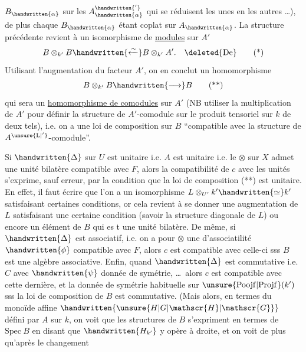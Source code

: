 $B_{\handwritten{\alpha}}$ sur les $A_{\handwritten{\alpha}}^{\handwritten{'}}$ qui se réduisent les unes en les autres \ldots),  de plus chaque $B_{\handwritten{\alpha}}$ étant coplat sur $A_{\handwritten{\alpha}}$. La structure précédente revient à un isomorphisme de \uline{modules} sur  $A'$
\[
B\otimes_{k'}B\handwritten{\xleftarrow{\sim}}B\otimes_{k'}A'.\quad\deleted{\text{De}}
\tag*{(*)}
\]
Utilisant l'augmentation du facteur $A'$, on en conclut un homomorphisme
\[
B\otimes_{k'}B\handwritten{\longrightarrow}B
\tag*{(**)}
\]
qui sera un \uline{homomorphisme de comodules} sur $A'$ (NB utiliser la multiplication de $A'$ pour définir la structure de $A'$-comodule sur le produit tensoriel sur $k$ de deux tels), i.e. on a une loi de composition sur $B$ ``compatible avec la structure de $A^{\unsure{\mathrm{L}|'}}$-comodule''.

Si $\handwritten{\Delta}$ sur $U$ est unitaire i.e. $A$ est unitaire i.e. le $\otimes$ sur $X$  admet une unité bilatère compatible avec $F$, alors la compatibilité de $c$ avec les unités s'exprime, sauf erreur, par la condition que la loi de composition (**) est unitaire.\deleted{\unsure{(}} En effet, il faut écrire que l'on a un isomorphisme  $L\otimes_{U'}k'\handwritten{\simeq}k'$ satisfaisant certaines conditions, or cela revient à se donner une augmentation de $L$ satisfaisant une certaine condition (savoir  la structure diagonale de $L$) ou encore un élément de $B$ qui es t une unité bilatère. De même, si $\handwritten{\Delta}$ est associatif, i.e. on a pour $\otimes$ une  d'associatilité $\handwritten{\phi}$ compatible avec $F$, alors $c$ est compatible avec celle-ci sss $B$ est une algèbre associative.  Enfin, quand $\handwritten{\Delta}$ est commutative i.e. $C$ avec $\handwritten{\psi}$ donnée de symétrie, \ldots\ alors $c$ est compatible avec cette dernière, et la donnée de symétrie habituelle sur $\unsure{\mathrm{Poojf}|\mathrm{Projf}}(k')$ sss la loi de composition de $B$ est  commutative. \handwritten{[}(Mais alors, en termes du monoïde affine $\handwritten{\unsure{H|G|\mathscr{H}|\mathscr{G}}}$ défini par $A$ sur $k$, on voit que les structures de $B$ s'expriment en termes de $\mathrm{Spec}\ B$ en disant que $\handwritten{H_{k'}}$ y opère à droite, et on voit de plus qu'après le changement
